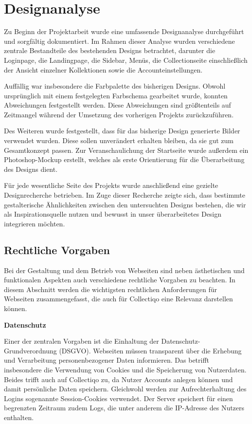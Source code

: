 \section{Designanalyse}\label{sec:section-three}

Zu Beginn der Projektarbeit wurde eine umfassende Designanalyse durchgeführt und sorgfältig dokumentiert.
Im Rahmen dieser Analyse wurden verschiedene zentrale Bestandteile des bestehenden Designs betrachtet, darunter die Loginpage, die Landingpage, die Sidebar, Menüs, die Collectionseite einschließlich der Ansicht einzelner Kollektionen sowie die Accounteinstellungen.

Auffällig war insbesondere die Farbpalette des bisherigen Designs.
Obwohl ursprünglich mit einem festgelegten Farbschema gearbeitet wurde, konnten Abweichungen festgestellt werden.
Diese Abweichungen sind größtenteils auf Zeitmangel während der Umsetzung des vorherigen Projekts zurückzuführen.

Des Weiteren wurde festgestellt, dass für das bisherige Design generierte Bilder verwendet wurden.
Diese sollen unverändert erhalten bleiben, da sie gut zum Gesamtkonzept passen.
Zur Veranschaulichung der Startseite wurde außerdem ein Photoshop-Mockup erstellt, welches als erste Orientierung für die Überarbeitung des Designs dient.

Für jede wesentliche Seite des Projekts wurde anschließend eine gezielte Designrecherche betrieben.
Im Zuge dieser Recherche zeigte sich, dass bestimmte gestalterische Ähnlichkeiten zwischen den untersuchten Designs bestehen, die wir als Inspirationsquelle nutzen und bewusst in unser überarbeitetes Design integrieren möchten.

\subsection{Rechtliche Vorgaben}\label{subsec:subsection-three-one}

Bei der Gestaltung und dem Betrieb von Webseiten sind neben ästhetischen und funktionalen Aspekten auch verschiedene rechtliche Vorgaben zu beachten.
In diesem Abschnitt werden die wichtigsten rechtlichen Anforderungen für Webseiten zusammengefasst, die auch für Collectiqo eine Relevanz darstellen können.

\textbf{Datenschutz}\par
Einer der zentralen Vorgaben ist die Einhaltung der Datenschutz-Grundverordnung (DSGVO).
Webseiten müssen transparent über die Erhebung und Verarbeitung personenbezogener Daten informieren.
Das betrifft insbesondere die Verwendung von Cookies und die Speicherung von Nutzerdaten.
Beides trifft auch auf Collectiqo zu, da Nutzer Accounts anlegen können und damit persönliche Daten speichern.
Gleichwohl werden zur Aufrechterhaltung des Logins sogenannte Session-Cookies verwendet.
Der Server speichert für einen begrenzten Zeitraum zudem Logs, die unter anderem die IP-Adresse des Nutzers enthalten.

